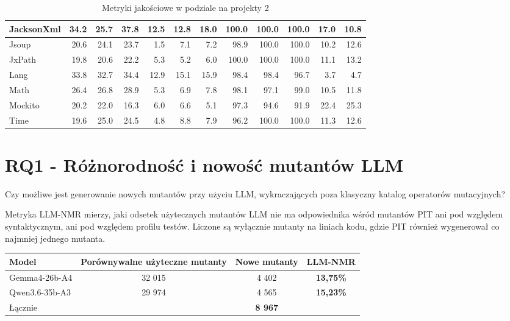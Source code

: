 \documentclass[12pt,a4paper,oldfontcommands]{memoir}
\theoremstyle{plain}
\theoremstyle{definition}
\theoremstyle{remark}
\begin{document}
\begin{table}[H]
\begin{tabular}{|l|r|r|r|r|r|r|r|r|r|r|r|}
            JacksonXml & 34.2 & 25.7 & 37.8 & 12.5 & 12.8 & 18.0 & 100.0 & 100.0 & 100.0 & 17.0 & 10.8 \\ \hline
            Jsoup & 20.6 & 24.1 & 23.7 & 1.5 & 7.1 & 7.2 & 98.9 & 100.0 & 100.0 & 10.2 & 12.6 \\ \hline
            JxPath & 19.8 & 20.6 & 22.2 & 5.3 & 5.2 & 6.0 & 100.0 & 100.0 & 100.0 & 11.1 & 13.2 \\ \hline
            Lang & 33.8 & 32.7 & 34.4 & 12.9 & 15.1 & 15.9 & 98.4 & 98.4 & 96.7 & 3.7 & 4.7 \\ \hline
            Math & 26.4 & 26.8 & 28.9 & 5.3 & 6.9 & 7.8 & 98.1 & 97.1 & 99.0 & 10.5 & 11.8 \\ \hline
            Mockito & 20.2 & 22.0 & 16.3 & 6.0 & 6.6 & 5.1 & 97.3 & 94.6 & 91.9 & 22.4 & 25.3 \\ \hline
            Time & 19.6 & 25.0 & 24.5 & 4.8 & 8.8 & 7.9 & 96.2 & 100.0 & 100.0 & 11.3 & 12.6 \\ \hline
        \end{tabular}
        \caption{Metryki jakościowe w podziale na projekty 2}
        \label{tab:per_project_2}
    \end{table}

    \section{RQ1 - Różnorodność i nowość mutantów LLM}

    Czy możliwe jest generowanie nowych mutantów przy użyciu LLM, wykraczających poza klasyczny katalog operatorów mutacyjnych?

    Metryka LLM-NMR mierzy, jaki odsetek użytecznych mutantów LLM nie ma odpowiednika wśród mutantów PIT ani pod względem syntaktycznym, ani pod względem profilu testów.
    Liczone są wyłącznie mutanty na liniach kodu, gdzie PIT również wygenerował co najmniej jednego mutanta.

    \begin{table}[H]
        \centering
        \begin{tabular}{|l|c|c|c|}
            \hline
            Model & Porównywalne użyteczne mutanty & Nowe mutanty & LLM-NMR \\ \hline
            Gemma4-26b-A4 & 32 015 & 4 402 & \textbf{13,75\%} \\ \hline
            Qwen3.6-35b-A3 & 29 974 & 4 565 & \textbf{15,23\%} \\ \hline
            Łącznie & & \textbf{8 967} & \\ \hline
        \end{tabular}
    \end{table}
\end{document}
